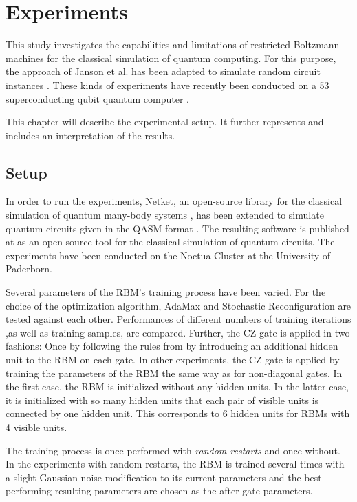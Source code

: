 \chapter{Experiments}

This study investigates the capabilities and limitations of restricted Boltzmann machines
for the classical simulation of quantum computing. For this purpose, the approach of Janson 
et al. \cite{jnsson2018neuralnetwork} has been adapted to simulate random circuit instances \cite{Boixo2018supremacy}.
These kinds of experiments have recently been conducted on a 53 superconducting qubit quantum computer \cite{martines2019supremacy}.

This chapter will describe the experimental setup. It further represents and includes an
interpretation of the results.

\section{Setup}

In order to run the experiments, Netket, an open-source library for the classical simulation of quantum 
many-body systems \cite{netket2019}, has been extended to simulate quantum circuits given in the QASM format \cite{cross2017open}. The resulting 
software is published at \cite{} as an open-source tool for the classical simulation 
of quantum circuits. The experiments have been conducted on the Noctua Cluster at the University of Paderborn.

Several parameters of the RBM's training process have been varied. For the choice of the optimization algorithm, AdaMax and 
Stochastic Reconfiguration are tested against each other. Performances of different numbers of training iterations 
,as well as training samples, are compared. Further, the CZ gate is applied in two fashions: Once 
by following the rules from \cite{jnsson2018neuralnetwork} by introducing an additional hidden unit to the RBM on each gate. In other 
experiments, the CZ gate is applied by training the parameters of the RBM the same way as for 
non-diagonal gates. In the first case, the RBM is initialized without any hidden units. In the latter 
case, it is initialized with so many hidden units that each pair of visible units is connected 
by one hidden unit. This corresponds to 6 hidden units for RBMs with 4 visible units.

The training process is once performed with \textit{random restarts} and once without. 
In the experiments with random restarts, the RBM is trained several times with a slight Gaussian noise modification to its 
current parameters and the best performing resulting parameters are chosen as the after gate parameters. 

